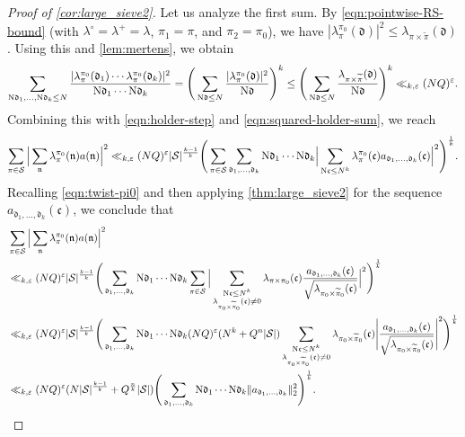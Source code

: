\documentclass[11pt]{amsart}
\theoremstyle{remark}
\numberwithin{equation}{section}
\newcommand{\kc}{\mathfrak{c}}
\newcommand{\kd}{\mathfrak{d}}
\newcommand{\kn}{\mathfrak{n}}
\newcommand{\N}{\textnormal{N}}
\newcommand{\mS}{\mathcal{S}}
\renewcommand{\tilde}{\widetilde}
\renewcommand{\epsilon}{\varepsilon}
\begin{document}
\begin{proof}[Proof of \cref{cor:large_sieve2}]
Let us analyze the first sum.
By \eqref{eqn:pointwise-RS-bound} (with $\lambda^{\circ}=\lambda^+=\lambda$, $\pi_1=\pi$, and $\pi_2=\pi_0$), we have $|\lambda_\pi^{\pi_0}(\kd)|^2 \le \lambda_{\pi \times \tilde\pi}(\kd)$. Using this and \cref{lem:mertens}, we obtain 
\[
    \sum_{\N \kd_1, \ldots, \N \kd_k \le N}
    \frac{|\lambda^{\pi_0}_\pi(\kd_1) \cdots \lambda^{\pi_0}_\pi(\kd_k)|^2}{\N\kd_1 \cdots \N\kd_k}
    =
    \Bigg( \sum_{\N\kd \le N} \frac{|\lambda_\pi^{\pi_0}(\kd)|^2}{\N\kd} \Bigg)^k
    \le
    \Bigg( \sum_{\N\kd \le N} \frac{\lambda_{\pi \times \tilde\pi}(\kd)}{\N\kd} \Bigg)^k
    \ll_{k,\epsilon} (NQ)^{\epsilon}.
\]
Combining this with \eqref{eqn:holder-step} and \eqref{eqn:squared-holder-sum}, we reach
\[
\sum_{\pi \in \mS} \Big\vert \sum_\kn \lambda_\pi^{\pi_0}(\kn) a(\kn) \Big\vert^2
    \ll_{k,\epsilon} (NQ)^{\epsilon}
    |\mS|^{\frac{k-1}{k}}
    \Bigg(
    \sum_{\pi \in \mS}
    \sum_{\kd_1, \ldots, \kd_k} \N\kd_1 \cdots \N\kd_k
    \Big\vert 
    \sum_{\N\kc \le N^k}
    \lambda^{\pi_0}_\pi(\kc) 
    a_{\kd_1,\ldots,\kd_k}(\kc) \Big\vert^2
    \Bigg)^{\frac{1}{k}}.
\]
Recalling \eqref{eqn:twist-pi0} and then applying \cref{thm:large_sieve2} for the sequence $a_{\kd_1,\ldots,\kd_k}(\kc)$, we conclude that
\[
\begin{aligned}
    &\sum_{\pi \in \mS} \Big\vert \sum_\kn \lambda_\pi^{\pi_0}(\kn) a(\kn) \Big\vert^2\\
    &\ll_{k,\epsilon} (NQ)^{\epsilon} |\mS|^{\frac{k-1}{k}} \Bigg(\sum_{\kd_1,\ldots,\kd_k} \N\kd_1 \cdots \N\kd_k \sum_{\pi \in \mS} \Big\vert \sum_{\substack{\N\kc \le N^k \\ \lambda_{\pi_0 \times \tilde\pi_0}(\kc) \neq 0}} \lambda_{\pi \times \pi_0}(\kc) \frac{a_{\kd_1,\ldots,\kd_k}(\kc)}{\sqrt{\lambda_{\pi_0 \times \tilde\pi_0}(\kc)}} \Big\vert^2
    \Bigg)^{\frac{1}{k}}
    \\
    &\ll_{k,\epsilon} (NQ)^{\epsilon} |\mS|^{\frac{k-1}{k}} \Bigg(\sum_{\kd_1, \ldots, \kd_k} \N\kd_1 \cdots \N\kd_k (NQ)^{\epsilon} (N^k + Q^n|\mS|) \sum_{\substack{\N\kc\leq N^k \\ \lambda_{\pi_0\times\tilde{\pi}_0}(\kc)\neq 0}}\lambda_{\pi_0\times\tilde{\pi}_0}(\kc)\Bigg|\frac{a_{\kd_1,\ldots,\kd_k}(\kc)}{\sqrt{\lambda_{\pi_0 \times \tilde\pi_0}(\kc)}}\Bigg|^2 \Bigg)^{\frac{1}{k}}
    \\
    &\ll_{k,\epsilon} (NQ)^{\epsilon}
    (N|\mS|^{\frac{k-1}{k}} + Q^{\frac{n}{k}}|\mS|)
    \Bigg(
    \sum_{\kd_1, \ldots, \kd_k} \N\kd_1 \cdots \N\kd_k
    \|a_{\kd_1,\ldots,\kd_k}\|_2^2
    \Bigg)^{\frac{1}{k}}.
\end{aligned}
\]
\end{proof}
\end{document}
